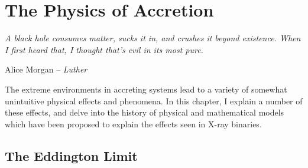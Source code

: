 \chapter{The Physics of Accretion}

\label{sec:PhysAcc}

\epigraph{\textit{A black hole consumes matter, sucks it in, and crushes it beyond existence. When I first heard that, I thought that's evil in its most pure.}}{Alice Morgan -- \textit{Luther}}

\vspace{1cm}

\par\noindent The extreme environments in accreting systems lead to a variety of somewhat unintuitive physical effects and phenomena.  In this chapter, I explain a number of these effects, and delve into the history of physical and mathematical models which have been proposed to explain the effects seen in X-ray binaries.

\section{The Eddington Limit}

